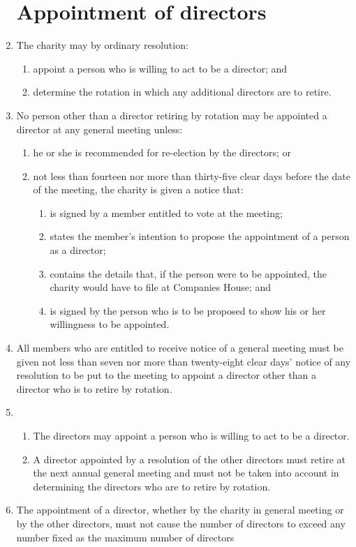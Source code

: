 \documentclass{article}
\begin{document}
\begin{enumerate}[label=\arabic*, start=23]
    \section{Appointment of directors}
    \item  The charity may by ordinary resolution:
    \begin{enumerate}[label=(\arabic*)]
    \item  appoint a person who is willing to act to be a director; and
    \item  determine the rotation in which any additional directors are
    to retire.
    \end{enumerate}
    \item No person other than a director retiring by rotation may be appointed a
    director at any general meeting unless:
    \begin{enumerate}[label=(\arabic*)]
        \item he or she is recommended for re-election by the directors; or
        \item not less than fourteen nor more than thirty-five clear days
        before the date of the meeting, the charity is given a
        notice that:
        \begin{enumerate}[label=(\alph*)]
            \item is signed by a member entitled to vote at the meeting;
            \item states the member's intention to propose the
            appointment of a person as a director;
            \item contains the details that, if the person were to be
            appointed, the charity would have to file at Companies
            House; and
            \item is signed by the person who is to be proposed to show his
            or her willingness to be appointed.
        \end{enumerate}
    \end{enumerate}
    \item All members who are entitled to receive notice of a general meeting
    must be given not less than seven nor more than twenty-eight clear
    days' notice of any resolution to be put to the meeting to appoint a
    director other than a director who is to retire by rotation.
    \item \begin{enumerate}[label=(\arabic*)]
        \item The directors may appoint a person who is willing to act to be
        a director.
       \item A director appointed by a resolution of the other directors must
        retire at the next annual general meeting and must not be
        taken into account in determining the directors who are to retire
        by rotation.
    \end{enumerate}
    \item The appointment of a director, whether by the charity in general
    meeting or by the other directors, must not cause the number of
    directors to exceed any number fixed as the maximum number
    of directors
    

\end{enumerate}
\end{document}
